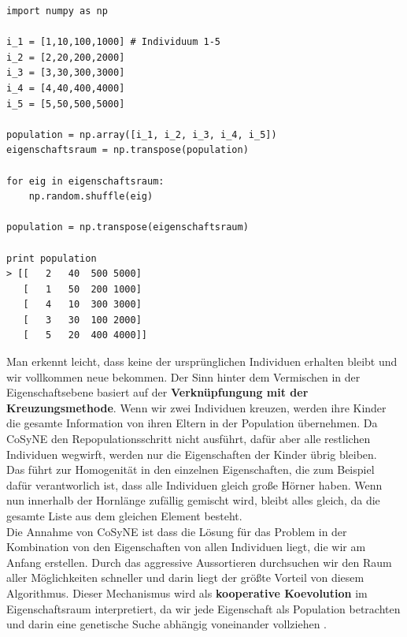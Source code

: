             \begin{mdframed}
            \begin{verbatim}
import numpy as np

i_1 = [1,10,100,1000] # Individuum 1-5
i_2 = [2,20,200,2000]
i_3 = [3,30,300,3000]
i_4 = [4,40,400,4000]
i_5 = [5,50,500,5000]

population = np.array([i_1, i_2, i_3, i_4, i_5])
eigenschaftsraum = np.transpose(population)
  
for eig in eigenschaftsraum:
    np.random.shuffle(eig)

population = np.transpose(eigenschaftsraum)

print population
> [[   2   40  500 5000]
   [   1   50  200 1000]
   [   4   10  300 3000]
   [   3   30  100 2000]
   [   5   20  400 4000]]

            \end{verbatim}
            \end{mdframed}
            \noindent
            Man erkennt leicht, dass keine der ursprünglichen Individuen erhalten bleibt und wir vollkommen neue bekommen. Der Sinn hinter dem Vermischen in der Eigenschaftsebene basiert auf der \textbf{Verknüpfungung mit der Kreuzungsmethode}. Wenn wir zwei Individuen kreuzen, werden ihre Kinder die gesamte Information von ihren Eltern in der Population übernehmen. Da CoSyNE den Repopulationsschritt nicht ausführt, dafür aber alle restlichen Individuen wegwirft, werden nur die Eigenschaften der Kinder übrig bleiben.\\

            \noindent
            Das führt zur Homogenität in den einzelnen Eigenschaften, die zum Beispiel dafür verantworlich ist, dass alle Individuen gleich große Hörner haben. Wenn nun innerhalb der Hornlänge zufällig gemischt wird, bleibt alles gleich, da die gesamte Liste aus dem gleichen Element besteht. \\

            \noindent
            Die Annahme von CoSyNE ist dass die Lösung für das Problem in der Kombination von den Eigenschaften von allen Individuen liegt, die wir am Anfang erstellen. Durch das aggressive Aussortieren durchsuchen wir den Raum aller Möglichkeiten schneller und darin liegt der größte Vorteil von diesem Algorithmus. Dieser Mechanismus wird als \textbf{kooperative Koevolution} im Eigenschaftsraum interpretiert, da wir jede Eigenschaft als Population betrachten und darin eine genetische Suche abhängig voneinander vollziehen \cite{cosyne2}. \\


